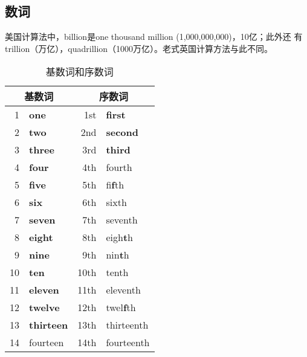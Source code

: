 
\subsection{数词}
美国计算法中，billion是one thousand million (1,000,000,000)，10亿；此外还
有trillion（万亿），quadrillion（1000万亿）。老式英国计算方法与此不同。

\begin{table}[tp!]
  \centering \footnotesize
  \caption[skip=2pt]{基数词和序数词}
  \label{tab:onefirst}
  \begin{tabular}[hp!]{rlrl}
    \toprule
    \multicolumn{2}{c}{基数词 } & \multicolumn{2}{c}{序数词 } \\ \midrule
    1         & \textbf{one}                   & 1st         & \textbf{first}                   \\
    2         & \textbf{two}                   & 2nd         & \textbf{second}                  \\
    3         & \textbf{three}                 & 3rd         & \textbf{third}                   \\
    4         & \textbf{four}                  & 4th         & fourth                     \\
    5         & \textbf{five}                  & 5th         & fi\textbf{f}th                   \\
    6         & \textbf{six}                   & 6th         & sixth                      \\
    7         & \textbf{seven}                 & 7th         & seventh                    \\
    8         & \textbf{eight}                 & 8th         & eigh\textbf{t}h                  \\
    9         & \textbf{nine}                  & 9th         & nin\textbf{t}h                   \\
    10        & \textbf{ten}                   & 10th        & tenth                      \\
    11        & \textbf{eleven}                & 11th        & eleventh                   \\
    12        & \textbf{twelve}                & 12th        & twel\textbf{f}th                 \\
    13        & \textbf{thirteen}              & 13th        & thirteenth                 \\
    14        & fourteen                 & 14th        & fourteenth                 \\

\end{tabular}
\end{table}
